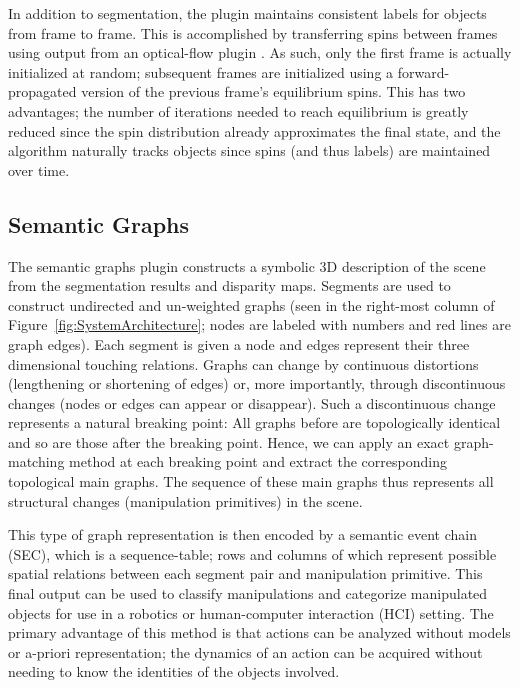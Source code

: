 In addition to segmentation, the plugin maintains consistent labels for objects from frame to frame. This is accomplished by transferring spins between frames using output from an optical-flow plugin \cite{Abramov_3DSegmentation}. As such, only the first frame is actually initialized at random; subsequent frames are initialized using a forward-propagated version of the previous frame's equilibrium spins. This has two advantages; the number of iterations needed to reach equilibrium is greatly reduced since the spin distribution already approximates the final state, and the algorithm naturally tracks objects since spins (and thus labels) are maintained over time.
 
\subsection{Semantic Graphs}
The semantic graphs plugin constructs a symbolic 3D description of the scene from the segmentation results and disparity maps. Segments are used to construct undirected and un-weighted graphs (seen in the right-most column of Figure~\ref{fig:SystemArchitecture}; nodes are labeled with numbers and red lines are graph edges). Each segment is given a node and edges represent their three dimensional touching relations. Graphs can change by continuous distortions (lengthening or shortening of edges) or, more importantly, through discontinuous changes (nodes or edges can appear or disappear). Such a discontinuous change represents a natural breaking point: All graphs before are topologically identical and so are those after the breaking point. Hence, we can apply an exact graph-matching method \cite{Sumsi08} at each breaking point and extract the corresponding topological main graphs. The sequence of these main graphs thus represents all structural changes (manipulation primitives) in the scene. 

This type of graph representation is then encoded by a semantic event chain (SEC), which is a sequence-table; rows and columns of which represent possible spatial relations between each segment pair and manipulation primitive. This final output can be used to classify manipulations and categorize manipulated objects for use in a robotics or human-computer interaction (HCI) setting\cite{Aksoy2010,Aksoy2011}. The primary advantage of this method is that actions can be analyzed without models or a-priori representation; the dynamics of an action can be acquired without needing to know the identities of the objects involved.

